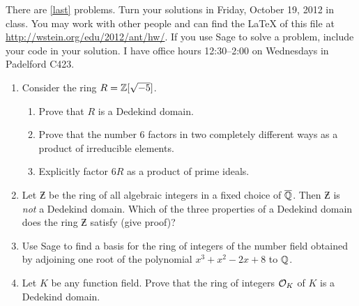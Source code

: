 \documentclass{article}
\title{\dred{Math 581e, Fall 2012, Homework 3}}
\author{William Stein ({\tt wstein@uw.edu})}
\date{Due: Friday, October 19, 2012}
\begin{document}
\maketitle

{\color{dbluecolor}There are \ref{last} problems. Turn your solutions
  in Friday, October 19, 2012 in class.  You may work with other
  people and can find the \LaTeX{} of this file at
  \url{http://wstein.org/edu/2012/ant/hw/}.  If you use Sage to solve
  a problem, include your code in your solution. I have office hours
  12:30--2:00 on Wednesdays in Padelford C423.  }

\begin{enumerate}


\item Consider the ring $R=\mathbb{Z}[\sqrt{-5}]$.
\begin{enumerate}
\item Prove that $R$ is a Dedekind domain.
\item Prove that the number $6$ factors
  in two completely different ways as a product of irreducible
  elements.  
\item Explicitly factor $6R$ as a product of prime ideals. 
\end{enumerate}

\item Let $\Zbar$ be the ring of all algebraic integers in
  a fixed choice of $\overline{\mathbb{Q}}$.  Then $\Zbar$ is {\em not} a Dedekind
  domain.  Which of the three properties of a Dedekind domain does the
  ring $\Zbar$ satisfy (give proof)?  

\item Use Sage to find a basis for the ring of integers of the number
  field obtained by adjoining one root of the polynomial $x^3 + x^2 -
  2x + 8$ to $\mathbb{Q}$.

\item\label{last} Let $K$ be any function field.  Prove that the ring
  of integers $\mathcal{O}_K$ of $K$ is a Dedekind domain.

\end{enumerate}
\end{document}
